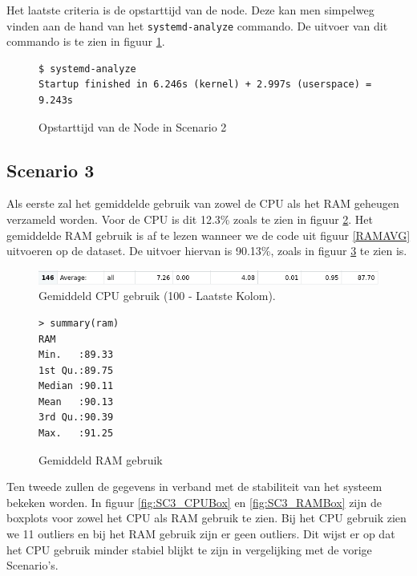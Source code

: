 Het laatste criteria is de opstarttijd van de node. Deze kan men simpelweg vinden aan de hand van het \verb|systemd-analyze| commando. De uitvoer van dit commando is te zien in figuur \ref{SC2_StartTime}.

\begin{figure}[h]
	\centering
	\begin{verbatim} 
$ systemd-analyze
Startup finished in 6.246s (kernel) + 2.997s (userspace) = 9.243s
	\end{verbatim}
	\caption{Opstarttijd van de Node in Scenario 2}
	\label{SC2_StartTime}
\end{figure}

\clearpage
\subsection{Scenario 3}
%

Als eerste zal het gemiddelde gebruik van zowel de CPU als het RAM geheugen verzameld worden. Voor de CPU is dit 12.3\% zoals te zien in figuur \ref{fig:SC3_CPUAVG}. Het gemiddelde RAM gebruik is af te lezen wanneer we de code uit figuur \ref{RAMAVG} uitvoeren op de dataset. De uitvoer hiervan is 90.13\%, zoals in figuur \ref{SC3_RAMAVG} te zien is.
\begin{figure}[h]
	\centering
	\includegraphics[width=\linewidth]{img/SC3_CPUAVG.png}
	\caption{Gemiddeld CPU gebruik (100 - Laatste Kolom).}
	\label{fig:SC3_CPUAVG}
\end{figure}
\begin{figure}[h]
	\centering
	\begin{verbatim} 
> summary(ram)
RAM       
Min.   :89.33  
1st Qu.:89.75  
Median :90.11  
Mean   :90.13  
3rd Qu.:90.39  
Max.   :91.25    
	\end{verbatim}
	\caption{Gemiddeld RAM gebruik}
	\label{SC3_RAMAVG}
\end{figure}

Ten tweede zullen de gegevens in verband met de stabiliteit van het systeem bekeken worden. In figuur \ref{fig:SC3_CPUBox} en \ref{fig:SC3_RAMBox} zijn de boxplots voor zowel het CPU als RAM gebruik te zien. Bij het CPU gebruik zien we 11 outliers en bij het RAM gebruik zijn er geen outliers. Dit wijst er op dat het CPU gebruik minder stabiel blijkt te zijn in vergelijking met de vorige Scenario's.

